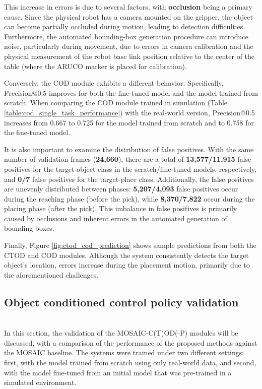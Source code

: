 This increase in errors is due to several factors, with \textbf{occlusion} being a primary cause. Since the physical robot has a camera mounted on the gripper, the object can become partially occluded during motion, leading to detection difficulties. Furthermore, the automated bounding-box generation procedure can introduce noise, particularly during movement, due to errors in camera calibration and the physical measurement of the robot base link position relative to the center of the table (where the ARUCO marker is placed for calibration).

Conversely, the COD module exhibits a different behavior. Specifically, Precision@0.5 improves for both the fine-tuned model and the model trained from scratch. When comparing the COD module trained in simulation (Table \ref{table:cod_single_task_performance}) with the real-world version, Precision@0.5 increases from 0.667 to 0.725 for the model trained from scratch and to 0.758 for the fine-tuned model. 

It is also important to examine the distribution of false positives. With the same number of validation frames (\textbf{24,660}), there are a total of \textbf{13,577/11,915} false positives for the target-object class in the scratch/fine-tuned models, respectively, and \textbf{0/7} false positives for the target-place class. Additionally, the false positives are unevenly distributed between phases: \textbf{5,207/4,093} false positives occur during the reaching phase (before the pick), while \textbf{8,370/7,822} occur during the placing phase (after the pick). This imbalance in false positives is primarily caused by occlusions and inherent errors in the automated generation of bounding boxes.

Finally, Figure \ref{fig:ctod_cod_prediction} shows sample predictions from both the CTOD and COD modules. Although the system consistently detects the target object's location, errors increase during the placement motion, primarily due to the aforementioned challenges.




\subsection{Object conditioned control policy validation}\mbox{}\\
In this section, the validation of the MOSAIC-C(T)OD(-P) modules will be discussed, with a comparison of the performance of the proposed methods against the MOSAIC baseline. The systems were trained under two different settings: first, with the model trained from scratch using only real-world data, and second, with the model fine-tuned from an initial model that was pre-trained in a simulated environment.

